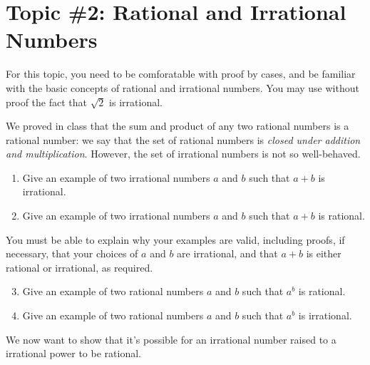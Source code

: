 \documentclass[letterpaper,12pt]{article}
\theoremstyle{definition}
\begin{document}
\section*{Topic \#2: Rational and Irrational Numbers}
For this topic, you need to be comforatable with proof by cases, and be familiar with the basic concepts of rational and irrational numbers. You may use without proof the fact that $\sqrt{2}$ is irrational.

We proved in class that the sum and product of any two rational numbers is a rational number: we say that the set of rational numbers is {\em closed under addition and multiplication}. However, the set of irrational numbers is not so well-behaved.

\begin{enumerate}
 \item Give an example of two irrational numbers $a$ and $b$ such that $a+b$ is irrational. 
 \item Give an example of two irrational numbers $a$ and $b$ such that $a+b$ is rational. 
\end{enumerate}
You must be able to explain why your examples are valid, including proofs, if necessary, that your choices of $a$ and $b$ are irrational, and that $a+b$ is either rational or irrational, as required. 
\begin{enumerate}\setcounter{enumi}{2}
 \item Give an example of two rational numbers $a$ and $b$ such that $a^b$ is rational.
 \item Give an example of two rational numbers $a$ and $b$ such that $a^b$ is irrational.
\end{enumerate}
We now want to show that it's possible for an irrational number raised to a irrational power to be rational.
\end{document}
